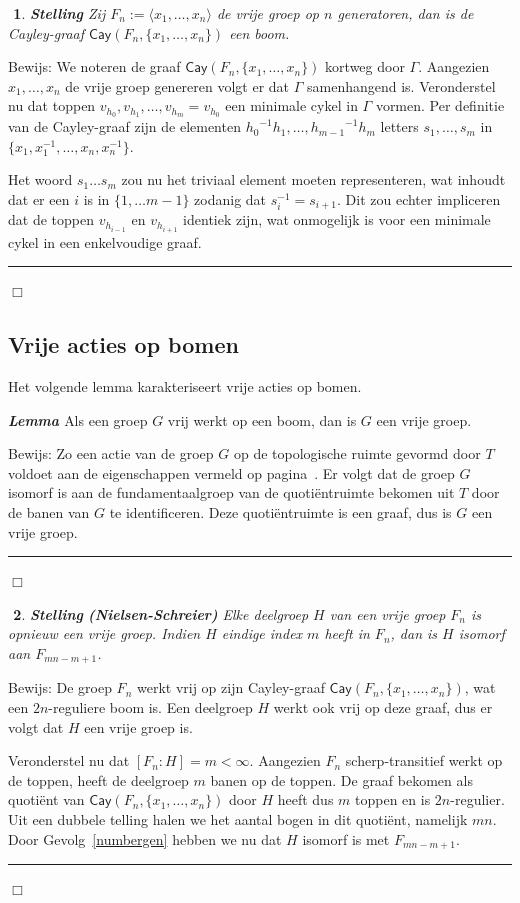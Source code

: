 \documentclass[12pt]{book}
\newcommand{\bew}{{\sc Bewijs: }}
\newcommand{\B}{\rule{1mm}{0mm} \hfill $\Box$ }
\newtheorem{stelh}{$\!\!$}[section]
\newenvironment{stel}{\begin{stelh}{\em {\bf Stelling }}}{\end{stelh}}
\newenvironment{lem}{\begin{lemh}{\em {\bf Lemma }}}{\end{lemh}}
\begin{document}
\begin{stel}
Zij $F_n := \langle x_1, \dots , x_n \rangle$ de vrije groep op $n$ generatoren, dan is de Cayley-graaf $\mathsf{Cay}(F_n,\{x_1, \dots, x_n\})$ een boom.
\end{stel}
\bew
We noteren de graaf $\mathsf{Cay}(F_n,\{x_1, \dots, x_n\})$ kortweg door $\Gamma$. Aangezien $x_1, \dots, x_n$ de vrije groep genereren volgt er dat $\Gamma$ samenhangend is. Veronderstel nu dat toppen $v_{h_0}, v_{h_1}, \dots, v_{h_m} = v_{h_0}$ een  minimale cykel in $\Gamma$ vormen. Per definitie van de Cayley-graaf zijn de elementen ${h_0}^{-1} h_1, \dots, {h_{m-1}}^{-1} h_m$ letters $s_1, \dots, s_m$ in $ \{x_1, x_1^{-1}, \dots, x_n,  x_n^{-1}\}$. 

Het woord $s_1\dots s_m$ zou nu het triviaal element moeten representeren, wat inhoudt dat er een $i$ is in $\{1, \dots m-1\}$ zodanig dat $s_i^{-1} = s_{i+1}$. Dit zou echter impliceren dat de toppen $v_{h_{i-1}}$ en $v_{h_{i+1}}$ identiek zijn, wat onmogelijk is voor een minimale cykel in een enkelvoudige graaf. \B

\subsection{Vrije acties op bomen}

Het volgende lemma karakteriseert vrije acties op bomen.

\begin{lem}
Als een groep $G$ vrij werkt op een boom, dan is $G$ een vrije groep.
\end{lem}
\bew
Zo een actie van de groep $G$ op de topologische ruimte gevormd door $T$ voldoet aan de eigenschappen vermeld op pagina~\pageref{freeaction}. Er volgt dat de groep $G$ isomorf is aan de fundamentaalgroep van de quoti\"entruimte bekomen uit $T$ door de banen van $G$ te identificeren. Deze quoti\"entruimte is een graaf, dus is $G$ een vrije groep.
\B

\begin{stel}\textbf{\em(Nielsen-Schreier)}
Elke deelgroep $H$ van een vrije groep $F_n$ is opnieuw een vrije groep. Indien $H$ eindige index $m$ heeft in $F_n$, dan is $H$ isomorf aan $F_{mn - m + 1}$.
\end{stel}
\bew
De groep $F_n$ werkt vrij op zijn Cayley-graaf $\mathsf{Cay}(F_n,\{ x_1, \dots , x_n \})$, wat een $2n$-reguliere boom is. Een deelgroep $H$ werkt ook vrij op deze graaf, dus er volgt dat $H$ een vrije groep is.

Veronderstel nu dat $[F_n: H] = m < \infty$.  Aangezien $F_n$ scherp-transitief werkt op de toppen, heeft de deelgroep $m$ banen op de toppen. De graaf bekomen als quoti\"ent van $\mathsf{Cay}(F_n,\{ x_1, \dots , x_n \})$ door $H$ heeft dus $m$ toppen en is $2n$-regulier. Uit een dubbele telling halen we het aantal bogen in dit quoti\"ent, namelijk $mn$. Door Gevolg~\ref{numbergen} hebben we nu dat $H$ isomorf is met $F_{mn - m + 1}$. \B
\end{document}
